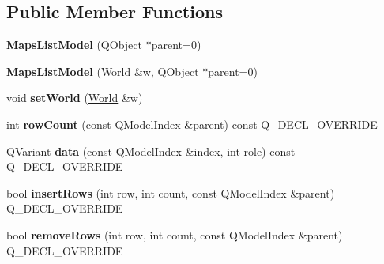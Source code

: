 \subsection*{\-Public \-Member \-Functions}
\begin{DoxyCompactItemize}
\item 
\hypertarget{class_maps_list_model_a09fd6cf0110fe6cc7771a51b3c6eb590}{{\bfseries \-Maps\-List\-Model} (\-Q\-Object $\ast$parent=0)}\label{class_maps_list_model_a09fd6cf0110fe6cc7771a51b3c6eb590}

\item 
\hypertarget{class_maps_list_model_a44a6bfcc427245fc0ad01850e18c42b3}{{\bfseries \-Maps\-List\-Model} (\hyperlink{class_world}{\-World} \&w, \-Q\-Object $\ast$parent=0)}\label{class_maps_list_model_a44a6bfcc427245fc0ad01850e18c42b3}

\item 
\hypertarget{class_maps_list_model_a603d8f94d010a6295c70da21308bc68f}{void {\bfseries set\-World} (\hyperlink{class_world}{\-World} \&w)}\label{class_maps_list_model_a603d8f94d010a6295c70da21308bc68f}

\item 
\hypertarget{class_maps_list_model_acec046632c59d580ca1915e70a8cec14}{int {\bfseries row\-Count} (const \-Q\-Model\-Index \&parent) const \-Q\-\_\-\-D\-E\-C\-L\-\_\-\-O\-V\-E\-R\-R\-I\-D\-E}\label{class_maps_list_model_acec046632c59d580ca1915e70a8cec14}

\item 
\hypertarget{class_maps_list_model_a3cab7c81a30a41d825bcc7e82d509ce3}{\-Q\-Variant {\bfseries data} (const \-Q\-Model\-Index \&index, int role) const \-Q\-\_\-\-D\-E\-C\-L\-\_\-\-O\-V\-E\-R\-R\-I\-D\-E}\label{class_maps_list_model_a3cab7c81a30a41d825bcc7e82d509ce3}

\item 
\hypertarget{class_maps_list_model_aafdc9fae57291d36d3c6b2754a1bc3a4}{bool {\bfseries insert\-Rows} (int row, int count, const \-Q\-Model\-Index \&parent) \-Q\-\_\-\-D\-E\-C\-L\-\_\-\-O\-V\-E\-R\-R\-I\-D\-E}\label{class_maps_list_model_aafdc9fae57291d36d3c6b2754a1bc3a4}

\item 
\hypertarget{class_maps_list_model_a3877cf5da4ec1004e8b867a7fa3599e9}{bool {\bfseries remove\-Rows} (int row, int count, const \-Q\-Model\-Index \&parent) \-Q\-\_\-\-D\-E\-C\-L\-\_\-\-O\-V\-E\-R\-R\-I\-D\-E}\label{class_maps_list_model_a3877cf5da4ec1004e8b867a7fa3599e9}

\end{DoxyCompactItemize}


